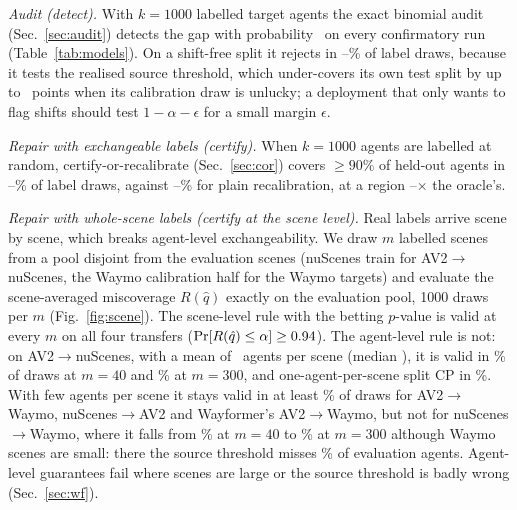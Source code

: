 \emph{Audit (detect).} With $k=1000$ labelled target agents the exact binomial audit (Sec.~\ref{sec:audit}) detects the gap
with probability \auditPowerConfMin\ on every confirmatory run (Table~\ref{tab:models}). On a shift-free split it rejects in
\auditFaAllMin--\auditFaAllMax\% of label draws, because it tests the realised source threshold, which under-covers its own
test split by up to \auditSameGapMax\ points when its calibration draw is unlucky; a deployment that only wants to flag shifts
should test $1-\alpha-\epsilon$ for a small margin $\epsilon$.

\emph{Repair with exchangeable labels (certify).} When $k=1000$ agents are labelled at random, certify-or-recalibrate
(Sec.~\ref{sec:cor}) covers $\ge90\%$ of held-out agents in \corCORMin--\corCORMax\% of label draws, against
\corDirectMin--\corDirectMax\% for plain recalibration, at a region \corCORareaMin--\corCORareaMax$\times$ the oracle's.

\emph{Repair with whole-scene labels (certify at the scene level).} Real labels arrive scene by scene, which breaks agent-level exchangeability. We
draw $m$ labelled scenes from a pool disjoint from the evaluation scenes (nuScenes train for AV2$\to$nuScenes, the
Waymo calibration half for the Waymo targets) and evaluate the scene-averaged miscoverage $R(\hat q)$ exactly on the
evaluation pool, 1000 draws per $m$ (Fig.~\ref{fig:scene}). The scene-level rule with the betting $p$-value is valid at
every $m$ on all four transfers ($\Pr[R(\hat q)\le\alpha]\ge0.94$). The agent-level rule is not: on
AV2$\to$nuScenes, with a mean of \nsAgentsMean\ agents per scene (median \nsAgentsMedian), it is valid in \agentCorNsForty\% of draws at $m=40$ and
\agentCorNsThreeHundred\% at $m=300$, and one-agent-per-scene split CP \cite{dunn2023hierarchical} in
\hierNsThreeHundred\%. With few agents per scene it stays valid in at least \agentCorSmallMin\% of draws for AV2$\to$Waymo,
nuScenes$\to$AV2 and Wayformer's AV2$\to$Waymo, but not for nuScenes$\to$Waymo, where it falls from
\agentCorNsWmForty\% at $m=40$ to \agentCorNsWmThreeHundred\% at $m=300$ although Waymo scenes are small: there the
source threshold misses \rSrcNsWm\% of evaluation agents. Agent-level guarantees fail where scenes are large or the
source threshold is badly wrong (Sec.~\ref{sec:wf}).

